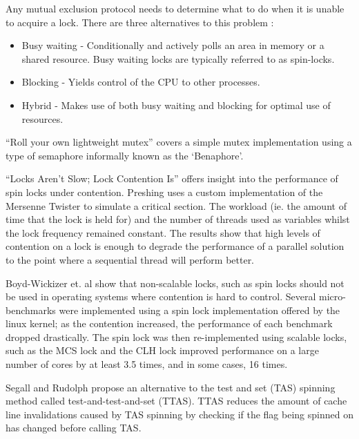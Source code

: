 
Any mutual exclusion protocol needs to determine what to do when it is unable to acquire a lock. There are three alternatives to this problem \cite[Chapter~7]{herlihy2020art}:
\begin{itemize}
  \item Busy waiting - Conditionally and actively polls an area in memory or a shared resource. Busy waiting locks are typically referred to as spin-locks.
  \item Blocking - Yields control of the CPU to other processes.
  \item Hybrid - Makes use of both busy waiting and blocking for optimal use of resources.
\end{itemize}

``Roll your own lightweight mutex''\cite{preshingmutex} covers a simple mutex implementation using a type of semaphore informally known as the `Benaphore'\cite{haikubenaphore}.

``Locks Aren't Slow; Lock Contention Is''\cite{preshinglockcontentionslow} offers insight into the performance of spin locks under contention. Preshing uses a custom implementation of the Mersenne Twister \cite{matsumoto1998mersenne} to simulate a critical section. The workload (ie. the amount of time that the lock is held for) and the number of threads used as variables whilst the lock frequency remained constant. The results show that high levels of contention on a lock is enough to degrade the performance of a parallel solution to the point where a sequential thread will perform better.

Boyd-Wickizer et. al show that non-scalable locks, such as spin locks should not be used in operating systems where contention is hard to control. Several micro-benchmarks were implemented using a spin lock implementation offered by the linux kernel; as the contention increased, the performance of each benchmark dropped drastically. The spin lock was then re-implemented using scalable locks, such as the MCS lock \cite{mellor1991algorithms} and the CLH lock \cite{craig1993building,magnusson1994queue} improved performance on a large number of cores by at least 3.5 times, and in some cases, 16 times.

Segall and Rudolph \cite{rudolph1984dynamic} propose an alternative to the test and set (TAS) spinning method called test-and-test-and-set (TTAS). TTAS reduces the amount of cache line invalidations caused by TAS spinning by checking if the flag being spinned on has changed before calling TAS.

